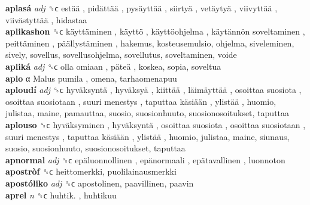 \textbf{aplasá} \emph{adj}  ␝ϲ   estää ,  pidättää ,  pysäyttää ,  siirtyä ,  vetäytyä ,  viivyttää ,  viivästyttää , hidastaa  \\
\textbf{aplikashon} ␝ϲ   käyttäminen ,  käyttö ,  käyttöohjelma ,  käytännön soveltaminen ,  peittäminen ,  päällystäminen , hakemus, kosteusemulsio, ohjelma, siveleminen, sively, sovellus, sovellusohjelma, sovellutus, soveltaminen, voide  \\
\textbf{apliká} \emph{adj}  ␝ϲ   olla omiaan ,  päteä , koskea, sopia, soveltua  \\
\textbf{aplo} α   Malus pumila , omena, tarhaomenapuu  \\
\textbf{aploudí} \emph{adj}  ␝ϲ   hyväksyntä ,  hyväksyä ,  kiittää ,  läimäyttää ,  osoittaa suosiota ,  osoittaa suosiotaan ,  suuri menestys ,  taputtaa käsiään ,  ylistää , huomio, julistaa, maine, pamauttaa, suosio, suosionhuuto, suosionosoitukset, taputtaa  \\
\textbf{aplouso} ␝ϲ   hyväksyminen ,  hyväksyntä ,  osoittaa suosiota ,  osoittaa suosiotaan ,  suuri menestys ,  taputtaa käsiään ,  ylistää , huomio, julistaa, maine, siunaus, suosio, suosionhuuto, suosionosoitukset, taputtaa  \\
\textbf{apnormal} \emph{adj}  ␝ϲ   epäluonnollinen ,  epänormaali ,  epätavallinen , luonnoton  \\
\textbf{apostròf} ␝ϲ  heittomerkki, puolilainausmerkki  \\
\textbf{apostóliko} \emph{adj}  ␝ϲ  apostolinen, paavillinen, paavin  \\
\textbf{aprel} \emph{n}  ␝ϲ   huhtik. , huhtikuu  \\
